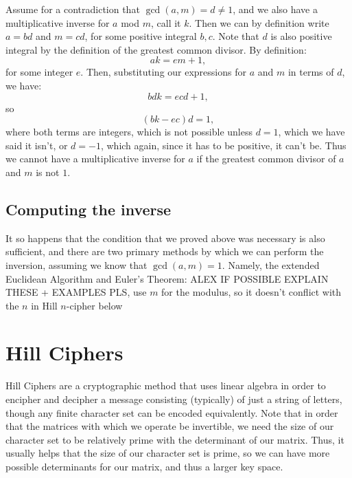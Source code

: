 \documentclass{article}
\begin{document}
\noindent Assume for a contradiction that $\gcd(a, m) = d \neq 1$, and we also have a multiplicative inverse for $a$ mod $m$, call it $k$. Then we can by definition write $a = bd$ and $m = cd$, for some positive integral $b, c$. Note that $d$ is also positive integral by the definition of the greatest common divisor. By definition:
\[
    ak = em + 1,
\]
for some integer $e$. Then, substituting our expressions for $a$ and $m$ in terms of $d$, we have:
\[
    bdk = ecd + 1,
\]
so
\[
    (bk - ec)d = 1,
\]
where both terms are integers, which is not possible unless $d = 1$, which we have said it isn't, or $d = -1$, which again, since it has to be positive, it can't be. Thus we cannot have a multiplicative inverse for $a$ if the greatest common divisor of $a$ and $m$ is not $1$. \medskip

\subsection{Computing the inverse}
It so happens that the condition that we proved above was necessary is also sufficient, and there are two primary methods by which we can perform the inversion, assuming we know that $\gcd(a, m) = 1$. Namely, the extended Euclidean Algorithm and Euler's Theorem: ALEX IF POSSIBLE EXPLAIN THESE + EXAMPLES PLS, use $m$ for the modulus, so it doesn't conflict with the $n$ in Hill $n$-cipher below

\section{Hill Ciphers}
Hill Ciphers are a cryptographic method that uses linear algebra in order to encipher and decipher a message consisting (typically) of just a string of letters, though any finite character set can be encoded equivalently. Note that in order that the matrices with which we operate be invertible, we need the size of our character set to be relatively prime with the determinant of our matrix. Thus, it usually helps that the size of our character set is prime, so we can have more possible determinants for our matrix, and thus a larger key space.
\end{document}
